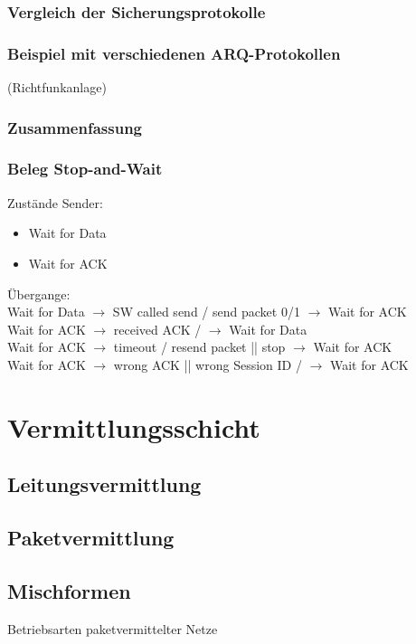 \subsection{Vergleich der Sicherungsprotokolle}
\subsection{Beispiel mit verschiedenen ARQ-Protokollen}
(Richtfunkanlage)
\subsection{Zusammenfassung}
\subsection{Beleg Stop-and-Wait}
Zustände Sender:
\begin{itemize}
\item Wait for Data
\item Wait for ACK
\end{itemize}
Übergange:\\
Wait for Data $\to$ SW called send / send packet 0/1 $\to$ Wait for ACK\\
Wait for ACK $\to$ received ACK /  $\to$ Wait for Data\\
Wait for ACK $\to$ timeout / resend packet || stop $\to$ Wait for ACK \\
Wait for ACK $\to$ wrong ACK || wrong Session ID / $\to$ Wait for ACK

\chapter{Vermittlungsschicht}
\section{Leitungsvermittlung}
\section{Paketvermittlung}
\section{Mischformen}
Betriebsarten paketvermittelter Netze
